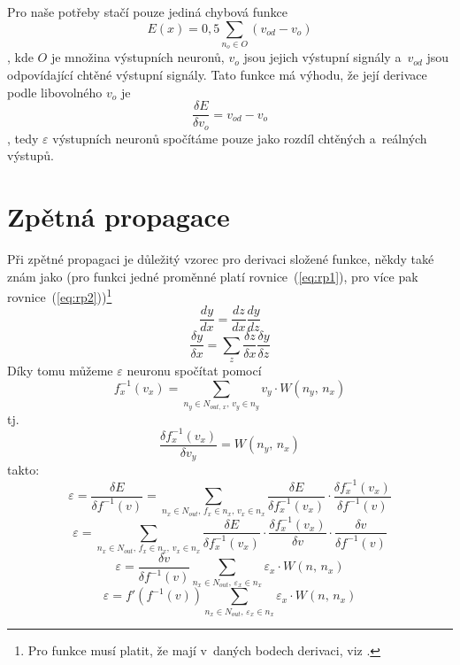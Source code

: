 \documentclass[12pt]{report}			%
\begin{document}
					Pro naše potřeby stačí pouze jediná chybová funkce
					\begin{equation} E(x) = 0,5\sum_{n_o \in O}\left(v_{od} - v_o\right) \end{equation}
					, kde $O$ je množina výstupních neuronů, $v_o$ jsou jejich výstupní signály a~$v_{od}$ jsou odpovídající chtěné výstupní signály. Tato funkce má výhodu, že její derivace podle libovolného $v_o$ je 
					\begin{equation} \frac{\delta E}{\delta v_o} = v_{od} - v_o \label{eq:ef} \end{equation}
					, tedy $\varepsilon$ výstupních neuronů spočítáme pouze jako rozdíl chtěných a~reálných výstupů.
				
				\section{Zpětná propagace}
					Při zpětné propagaci je důležitý vzorec pro derivaci složené funkce, někdy také znám jako  (pro funkci jedné proměnné platí rovnice~(\ref{eq:rp1}), pro více pak rovnice~(\ref{eq:rp2}))\footnote{Pro funkce musí platit, že mají v~daných bodech derivaci, viz \autocite[s. 623]{book:Matanalysis}.}
					\begin{equation} \frac{dy}{dx} = \frac{dz}{dx}\frac{dy}{dz} \label{eq:rp1} \end{equation}
					\begin{equation} \frac{\delta y}{\delta x} = \sum_z\frac{\delta z}{\delta x}\frac{\delta y}{\delta z} \label{eq:rp2} \end{equation}
					Díky tomu můžeme $\varepsilon$ neuronu spočítat pomocí
					\begin{equation} f_x^{-1}(v_x) = \sum_{n_y \in N_{out,\,x},\,v_y \in n_y} v_y \cdot W\left(n_y,\,n_x\right) \label{eq:f1} \end{equation}
					tj.
					\begin{equation} \frac{\delta f_x^{-1}(v_x)}{\delta v_y} = W\left(n_y,\,n_x\right) \end{equation}
					takto:
					\begin{equation} \varepsilon = \frac{ \delta E}{\delta f^{-1}(v)} = \sum_{n_x \in N_{out},\,f_x \in n_x,\,v_x \in n_x}\frac{ \delta E}{\delta f_x^{-1}(v_x)}\cdot\frac{ \delta f_x^{-1}(v_x)}{\delta f^{-1}(v)} \end{equation}
					\begin{equation} \varepsilon = \sum_{n_x \in N_{out},\,f_x \in n_x,\,v_x \in n_x}\frac{ \delta E}{\delta f_x^{-1}(v_x)}\cdot\frac{ \delta f_x^{-1}(v_x)}{\delta v}\cdot\frac{\delta v}{\delta f^{-1}(v)} \end{equation}
					\begin{equation} \varepsilon = \frac{ \delta v}{\delta f^{-1}(v)}\sum_{n_x \in N_{out},\,\varepsilon_x \in n_x}\varepsilon_x \cdot W\left(n,\,n_x\right) \end{equation}
					\begin{equation} \varepsilon = f'\left(f^{-1}(v)\right) \sum_{n_x \in N_{out},\,\varepsilon_x \in n_x} \varepsilon_x \cdot W\left(n,\,n_x\right) \label{eq:bpve} \end{equation}
					
\end{document}
